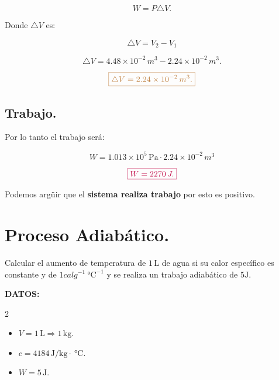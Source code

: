 \documentclass[a4paper,12pt]{article} %
\begin{document}
\[ W = P \triangle V. \]

\begin{justify}
	Donde \( \triangle V \) es:
\end{justify}

\[ \triangle V = V_2 -  V_1 \]

\[ \triangle V = 4.48 \times 10^{-2} \, m^3 - 2.24 \times 10^{-2} \, m^3. \]

\[ \textcolor{brown}{\boxed{ \triangle V = 2.24 \times 10^{-2} \, m^3.}} \]

\subsection{Trabajo.}

\begin{justify}
	Por lo tanto el trabajo será:
\end{justify}

\[ W = 1.013 \times 10^5 \, \mathrm{Pa} \cdot 2.24 \times 10^{-2} \, m^3 \]

\vspace{\baselineskip}

\[ \textcolor{purple}{\boxed{ W = 2270 \, J. }} \]

\begin{justify}
	Podemos argüir que el \textbf{sistema realiza trabajo} por esto es positivo.
\end{justify}

\section{Proceso Adiabático.}

\begin{justify}
	Calcular el aumento de temperatura de \( 1 \, \mathrm{L} \) de agua si su calor específico es constante y de \(1calg^{-1}  \SI{}{\degreeCelsius}^{-1}  \) y se realiza un trabajo adiabático de \( 5 \mathrm{J}\).
\end{justify}

\begin{justify}
	\textbf{DATOS:}
\end{justify}

\begin{multicols}{2}
	\begin{itemize}
		\item \( V = 1\,\mathrm{L} \Rightarrow 1 \, \mathrm{kg}. \)
		\item \( c = 4184 \, \mathrm{J}/ \mathrm{kg} \cdot \SI{}{\degreeCelsius}. \)
		\item \( W = 5 \, \mathrm{J}. \)
	\end{itemize}
\end{multicols}
\end{document}
